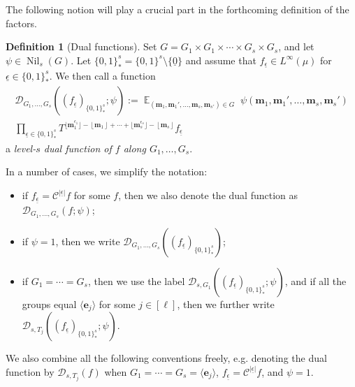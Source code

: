 \documentclass[11pt]{amsart}
\theoremstyle{definition}
\newtheorem{definition}[lemma]{Definition}
\DeclareMathOperator*{\E}{\mathbb{E}}
\newcommand{\CC}{{\mathcal C}}
\newcommand{\CD}{{\mathcal D}}
\newcommand{\CZ}{{\mathcal Z}}
\newcommand{\bm}{{\mathbf{m}}}
\newcommand{\be}{{\mathbf{e}}}
\newcommand{\eps}{\epsilon}
\newcommand{\ueps}{{\underline{\epsilon}}}
\newcommand{\1}{{\mathbf{1}}}
\DeclareMathOperator{\Nil}{Nil}
\newcommand{\floor}[1]{{\left \lfloor #1 \right \rfloor}}
\newcommand{\sfloor}[1]{{\lfloor #1 \rfloor}}
\begin{document}
The following notion will play a crucial part in the forthcoming definition of the factors. %
\begin{definition}[Dual functions]\label{D: dual functions}
    Set $G = G_1\times G_1 \times \cdots \times G_s\times G_s$, and let $\psi\in\Nil_s(G)$.
Let $\{0,1\}^s_* = \{0,1\}^s\setminus\{\underline{0}\}$ and assume that $f_\ueps\in L^\infty(\mu)$ for $\ueps\in \{0,1\}^s_*$.
We then call a function 
\begin{multline}\label{E: dual function}
    \CD_{G_1, \ldots, G_s}((f_\ueps)_{\{0,1\}^s_*}; \psi) := \E_{(\bm_1, \bm_1', \ldots, \bm_s, \bm_{s'})\in G}\; \psi(\bm_1,\bm_1',\ldots,\bm_s,\bm_s')\\
    \prod_{\ueps\in\{0,1\}^s_*}T^{\sfloor{\bm_1^{\eps_1}}-\floor{\bm_1}+\cdots + \sfloor{\bm_s^{\eps_s}}-\floor{\bm_s}} f_\ueps
\end{multline}
a \textit{level-$s$ dual function of $f$ along $G_1, \ldots, G_s$}. %

In a number of cases, we simplify the notation:
\begin{itemize}
    \item if $f_\ueps = \CC^{|\ueps|}f$ for some $f$, then we also denote the dual function as $\CD_{G_1, \ldots, G_s}(f; \psi)$;
    \item if $\psi = 1$, then we write $\CD_{G_1, \ldots, G_s}((f_\ueps)_{\{0,1\}^s_*})$;
    \item if $G_1 = \cdots = G_s$, then we use the label $\CD_{s, G_1}((f_\ueps)_{\{0,1\}^s_*}; \psi)$, and if all the groups equal $\langle \be_j \rangle$ for some $j\in[\ell]$, then we further write $\CD_{s, T_j}((f_\ueps)_{\{0,1\}^s_*}; \psi)$.
\end{itemize}
We also combine all the following conventions freely, e.g. denoting the dual function by $\CD_{s, T_j}(f)$ when $G_1 = \cdots = G_s = \langle \be_j \rangle$, $f_\ueps = \CC^{|\ueps|}f$, and $\psi = 1$.
\end{definition}
\end{document}
